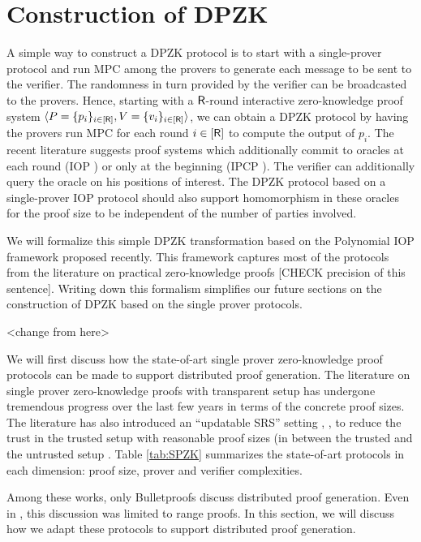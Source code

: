 \section{Construction of DPZK}
A simple way to construct a DPZK protocol is to start with a single-prover protocol and run MPC among the provers to generate each message to be sent to the verifier. The randomness in turn provided by the verifier can be broadcasted to the provers.
Hence, starting with a $\mathsf{R}$-round interactive zero-knowledge proof system $\langle P = \{p_i\}_{i\in[\mathsf{R}]},V = \{v_i\}_{i \in [\mathsf{R}]}\rangle$, we can obtain a DPZK protocol by having the provers run MPC for each round $i \in [\mathsf{R}]$ to compute the output of $p_i$. The recent literature suggests proof systems which additionally commit to oracles at each round (IOP \cite{aurora}) or only at the beginning (IPCP \cite{ligero}). The verifier can additionally query the oracle on his positions of interest. The DPZK protocol based on a single-prover IOP protocol should also support homomorphism in these oracles for the proof size to be independent of the number of parties involved.

We will formalize this simple DPZK transformation based on the Polynomial IOP framework \cite{polynomialiop,ahp} proposed recently. This framework captures most of the protocols from the literature on practical zero-knowledge proofs [CHECK precision of this sentence]. Writing down this formalism simplifies our future sections on the construction of DPZK based on the single prover protocols.



<change from here>

We will first discuss how the state-of-art single prover zero-knowledge proof protocols can be made to support distributed proof generation.
The literature on single prover zero-knowledge proofs with transparent setup has undergone tremendous progress over the last few years in terms of the concrete proof sizes. The literature has also introduced an ``updatable SRS'' setting \cite{sonic}, \cite{libra}, \cite{supersonic} to reduce the trust in the trusted setup with reasonable proof sizes (in between the trusted \cite{pinnochio_PHGR} and the untrusted setup \cite{Aurora, Bulletproofs}. \cite{Check} Table \ref{tab:SPZK} summarizes the state-of-art protocols in each dimension: proof size, prover and verifier complexities.

Among these works, only Bulletproofs \cite{Bulletproofs} discuss distributed proof generation. Even in \cite{Bulletproofs}, this discussion was limited to range proofs. In this section, we will discuss how we adapt these protocols to support distributed proof generation. %

